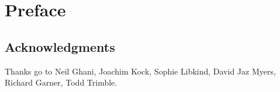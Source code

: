 \documentclass[Book-Poly]{subfiles}
\begin{document}
%


\setcounter{chapter}{-1}%


\chapter*{Preface}\label{chapter.0}


\section*{Acknowledgments}

Thanks go to Neil Ghani, Joachim Kock, Sophie Libkind, David Jaz Myers, Richard Garner, Todd Trimble.
\end{document}
